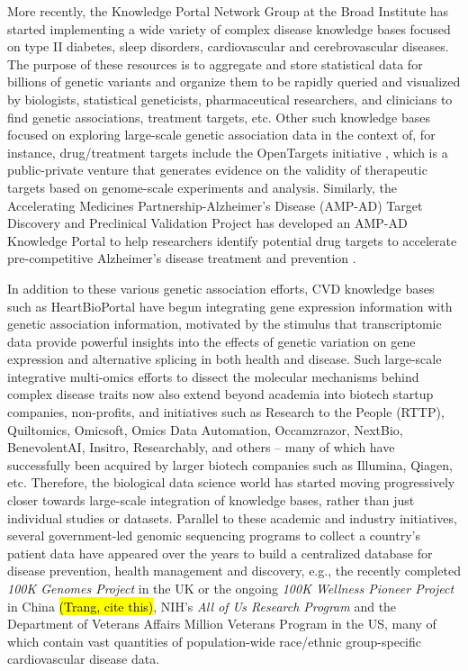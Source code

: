 \documentclass[letter]{bioinfo}
\begin{document}
More recently, the Knowledge Portal Network Group at the Broad Institute has started implementing a wide variety of complex disease knowledge bases focused on type II diabetes, sleep disorders, cardiovascular and cerebrovascular diseases.  The purpose of these resources is to aggregate and store statistical data for billions of genetic variants and organize them to be rapidly queried and visualized by biologists, statistical geneticists, pharmaceutical researchers, and clinicians to find genetic associations, treatment targets, etc.  Other such knowledge bases focused on exploring large-scale genetic association data in the context of, for instance, drug/treatment targets include the OpenTargets initiative \citep{Koscielny:2017:Open}, which is a public-private venture that generates evidence on the validity of therapeutic targets based on genome-scale experiments and analysis.  Similarly, the Accelerating Medicines Partnership-Alzheimer's Disease (AMP-AD) Target Discovery and Preclinical Validation Project has developed an AMP-AD Knowledge Portal to help researchers identify potential drug targets to accelerate pre-competitive Alzheimer's disease treatment and prevention \citep{NIA:2015:AMP}.  
	
	In addition to these various genetic association efforts, CVD knowledge bases such as HeartBioPortal \citep{Khomtchouk:2018:HeartBioPortal} have begun integrating gene expression information with genetic association information, motivated by the stimulus that transcriptomic data provide powerful insights into the effects of genetic variation on gene expression and alternative splicing in both health and disease.  Such large-scale integrative multi-omics efforts to dissect the molecular mechanisms behind complex disease traits now also extend beyond academia into biotech startup companies, non-profits, and initiatives such as Research to the People (RTTP), Quiltomics, Omicsoft, Omics Data Automation, Occamzrazor, NextBio, BenevolentAI, Insitro, Researchably, and others -- many of which have successfully been acquired by larger biotech companies such as Illumina, Qiagen, etc.  Therefore, the biological data science world has started moving progressively closer towards large-scale integration of knowledge bases, rather than just individual studies or datasets.  Parallel to these academic and industry initiatives, several government-led genomic sequencing programs to collect a country's patient data have appeared over the years to build a centralized database for disease prevention, health management and discovery, e.g., the recently completed \textit{100K Genomes Project} in the UK \citep{Caulfield:2017:100K} or the ongoing \textit{100K Wellness Pioneer Project} in China \hl{(Trang, cite this)}, NIH's \textit{All of Us Research Program} \citep{NIH:2018:All} and the Department of Veterans Affairs Million Veterans Program \citep{Gaziano:2016:Million} in the US, many of which contain vast quantities of population-wide race/ethnic group-specific cardiovascular disease data.  
\end{document}
